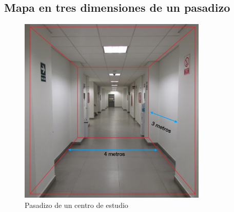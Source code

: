 \subsection{Mapa en tres dimensiones de un pasadizo}
\begin{figure}
  \centering \footnotesize
  \includegraphics[width=0.80\textwidth]{images/pasadizo_esan.JPG}
  \captionsetup{font=footnotesize}
  \caption{Pasadizo de un centro de estudio}
  \label{fig:pasadizoEsan}
\end{figure}


